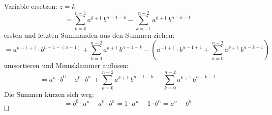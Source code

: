\documentclass{article}
\begin{document}
\begin{enumerate}[label = (\alph*)]
                Variable ersetzen: $z=k$ 
                $$ = \sum_{k=0}^{n-1} a^{k+1} \, b^{n-1-k} - \sum_{k=-1}^{n-2} a^{k+1} \, b^{n-k-1} $$
                ersten und letzten Summanden aus den Summen ziehen:
                $$ = a^{n-1+1} \cdot b^{n-1-(n-1)} + \sum_{k=0}^{n-2} a^{k+1} \, b^{n-1-k} - \left( a^{-1+1} \cdot b^{n-1+1} +  \sum_{k=0}^{n-2} a^{k+1} \, b^{n-k-1}  \right) $$
                umsortieren und Minusklammer auflösen:
                $$ = a^n \cdot b^0 - a^0 \cdot b^n \, + \sum_{k=0}^{n-2} a^{k+1} \, b^{n-1-k}  \, -  \sum_{k=0}^{n-2} a^{k+1} \, b^{n-k-1}   $$
                Die Summen kürzen sich weg:
                $$ = b^0 \cdot a^n - a^0 \cdot b^n = 1 \cdot a^n - 1 \cdot b^n = a^n -b^n $$
                $\hfill \square$
                
        \end{enumerate}
    
\end{document}
